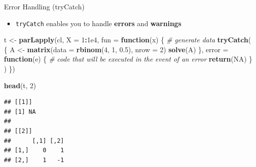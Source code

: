 \documentclass[
  ignorenonframetext,
]{beamer}
\newenvironment{Shaded}{\begin{snugshade}}{\end{snugshade}}
\newcommand{\AttributeTok}[1]{\textcolor[rgb]{0.13,0.29,0.53}{#1}}
\newcommand{\CommentTok}[1]{\textcolor[rgb]{0.56,0.35,0.01}{\textit{#1}}}
\newcommand{\ConstantTok}[1]{\textcolor[rgb]{0.56,0.35,0.01}{#1}}
\newcommand{\ControlFlowTok}[1]{\textcolor[rgb]{0.13,0.29,0.53}{\textbf{#1}}}
\newcommand{\DecValTok}[1]{\textcolor[rgb]{0.00,0.00,0.81}{#1}}
\newcommand{\FloatTok}[1]{\textcolor[rgb]{0.00,0.00,0.81}{#1}}
\newcommand{\FunctionTok}[1]{\textcolor[rgb]{0.13,0.29,0.53}{\textbf{#1}}}
\newcommand{\NormalTok}[1]{#1}
\newcommand{\OtherTok}[1]{\textcolor[rgb]{0.56,0.35,0.01}{#1}}
\newcommand{\SpecialCharTok}[1]{\textcolor[rgb]{0.81,0.36,0.00}{\textbf{#1}}}
\providecommand{\tightlist}{%
  \setlength{\itemsep}{0pt}\setlength{\parskip}{0pt}}
\begin{document}
\begin{frame}[fragile]{Error Handling (tryCatch)}
\protect{}\label{error-handling-trycatch}
\tiny

\begin{itemize}
\tightlist
\item
  \texttt{tryCatch} enables you to handle \textbf{errors} and
  \textbf{warnings}
\end{itemize}

\begin{Shaded}
\begin{Highlighting}[]
\NormalTok{t }\OtherTok{\textless{}{-}} \FunctionTok{parLapply}\NormalTok{(cl, }\AttributeTok{X =} \DecValTok{1}\SpecialCharTok{:}\FloatTok{1e4}\NormalTok{, }\AttributeTok{fun =} \ControlFlowTok{function}\NormalTok{(x) \{}
  \CommentTok{\# generate data}
  \FunctionTok{tryCatch}\NormalTok{(}
\NormalTok{    \{}
\NormalTok{      A }\OtherTok{\textless{}{-}} \FunctionTok{matrix}\NormalTok{(}\AttributeTok{data =} \FunctionTok{rbinom}\NormalTok{(}\DecValTok{4}\NormalTok{, }\DecValTok{1}\NormalTok{, }\FloatTok{0.5}\NormalTok{), }\AttributeTok{nrow =} \DecValTok{2}\NormalTok{)}
      \FunctionTok{solve}\NormalTok{(A)}
\NormalTok{    \},}
    \AttributeTok{error =} \ControlFlowTok{function}\NormalTok{(e) \{}
      \CommentTok{\# code that will be executed in the event of an error}
      \FunctionTok{return}\NormalTok{(}\ConstantTok{NA}\NormalTok{)}
\NormalTok{    \}}
\NormalTok{  )}
\NormalTok{\})}

\FunctionTok{head}\NormalTok{(t, }\DecValTok{2}\NormalTok{)}
\end{Highlighting}
\end{Shaded}

\begin{verbatim}
## [[1]]
## [1] NA
## 
## [[2]]
##      [,1] [,2]
## [1,]    0    1
## [2,]    1   -1
\end{verbatim}
\end{frame}
\end{document}
